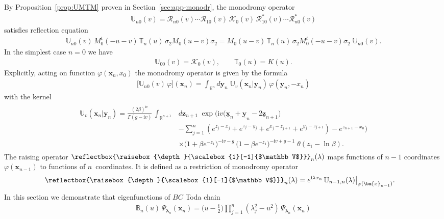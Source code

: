 \documentclass[11pt]{article}
\numberwithin{equation}{section}
\theoremstyle{plain}
\theoremstyle{definition}
\newcommand{\bbLambda}{\reflectbox{\raisebox{\depth}{\scalebox{1}[-1]{$\mathbb V$}}}}
\newcommand{\T}{\mathbb{T}}
\newcommand{\B}{\mathbb{B}}
\newcommand{\LLambda}{\bbLambda}
\newcommand{\MMO}{\mathbb{U}}
\renewcommand{\phi}{\varphi}
\renewcommand{\imath}{\mathrm{i}}
\begin{document}
By Proposition~\ref{prop:UMTM} proven in Section~\ref{sec:app-monodr}, the monodromy operator
\begin{align} \label{bc-mon-op-2}
	\MMO_{n 0}(v) = \mathcal{R}_{n 0}(v) \cdots \mathcal{R}_{1 0}(v) \, \mathcal{K}_0(v) \, \mathcal{R}^*_{1 0}(v) \cdots \mathcal{R}^*_{n 0}(v) 
\end{align}
satisfies reflection equation
\begin{align}\label{UMTM}
	\MMO_{n0}(v) \, M_0^t(- u - v) \, \T_n(u) \, \sigma_2 M_0(u - v) \sigma_2 = M_0(u - v) \, \T_n(u) \, \sigma_2 M_0^t(-u -v) \sigma_2 \; \MMO_{n0}(v).
\end{align}
In the simplest case $n = 0$ we have
\begin{align}
	\MMO_{00}(v) = \mathcal{K}_0(v), \qquad \T_0(u) = K(u). 
\end{align}
Explicitly, acting on function $\phi(\bm{x}_{n}, x_0)$ the monodromy operator is given by the formula 
\begin{align}
	\bigl[ \MMO_{n0}(v) \, \phi \bigr] (\bm{x}_n) = \int_{\mathbb{R}^{n}} d\bm{y}_{n} \; \MMO_v(\bm{x}_n | \bm{y}_{n}) \, \phi(\bm{y}_{n},-x_n)
\end{align}
with the kernel
\begin{align}\label{Un0}
	\begin{aligned}
		\MMO_v(\bm{x}_n | \bm{y}_{n}) = \frac{(2\beta)^{\imath v}}{\Gamma(g - \imath v)} \, \int_{\mathbb{R}^{n + 1}} & d\bm{z}_{n + 1} \; \exp \biggl( \imath v \bigl( \underline{\bm{x}}_n + \underline{\bm{y}}_{n} - 2 \underline{\bm{z}}_{n + 1} \bigr) \\[6pt]
		&  - \sum_{j = 1}^{n} (e^{z_j - x_j} + e^{z_j - y_j} + e^{x_j - z_{j + 1}} + e^{y_j - z_{j + 1}} ) - e^{z_{n + 1} - x_0}\biggr) \\[6pt]
		&  \times \bigl(1 + \beta e^{-z_1}\bigr)^{- \imath v - g} \, \bigl(1 - \beta e^{-z_1}\bigr)^{- \imath v + g - 1 } \; \theta(z_1 - \ln \beta).
	\end{aligned}
\end{align}
The raising operator $\LLambda_n(\lambda)$ maps functions of $n - 1$ coordinates $\phi(\bm{x}_{n - 1})$ to functions of $n$~coordinates. It is defined as a restriction of monodromy operator
\begin{align}
	\LLambda_n(\lambda) & = e^{\imath \lambda x_n} \, \MMO_{n - 1, n}(\lambda) \bigr|_{\phi(\bm{x}_{n - 1})}.
\end{align}
In this section we demonstrate that eigenfunctions of $BC$ Toda chain
\begin{align} \label{BPsi}
	\B_n(u) \, \Psi_{\bm{\lambda}_n}(\bm{x}_n) = \biggl( u - \frac{\imath}{2} \biggr) \prod_{j = 1}^n (\lambda_j^2 - u^2) \, \Psi_{\bm{\lambda}_n}(\bm{x}_n)
\end{align}
\end{document}

